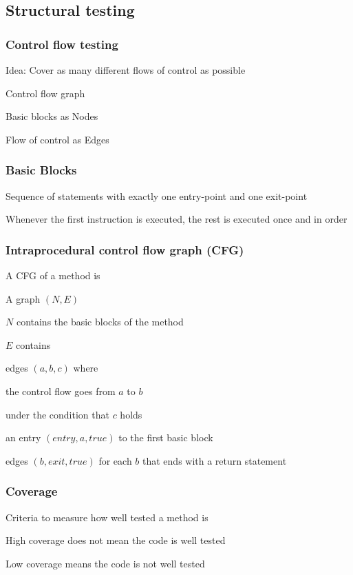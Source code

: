 \subsection{Structural testing}

\subsubsection{Control flow testing}
\enumstart
	\item Idea: Cover as many different flows of control as possible
	\item Control flow graph
	\enumstart
		\item Basic blocks as Nodes
		\item Flow of control as Edges
	\enumend
\enumend

\subsubsection{Basic Blocks}
\enumstart
	\item Sequence of statements with exactly one entry-point and one exit-point
	\item Whenever the first instruction is executed, the rest is executed once and in order
\enumend

\subsubsection{Intraprocedural control flow graph (CFG)}
\enumstart
	\item A CFG of a method is
	\enumstart
		\item A graph $(N, E)$
		\item $N$ contains the basic blocks of the method
		\item $E$ contains
		\enumstart
			\item edges $(a, b, c)$ where
			\enumstart
				\item the control flow goes from $a$ to $b$
				\item under the condition that $c$ holds
			\enumend
			\item an entry $(entry, a, true)$ to the first basic block
			\item edges $(b, exit, true)$ for each $b$ that ends with a return statement
		\enumend
	\enumend
\enumend

\subsubsection{Coverage}
\enumstart
	\item Criteria to measure how well tested a method is
	\item High coverage does not mean the code is well tested
	\item Low coverage means the code is not well tested
\enumend

